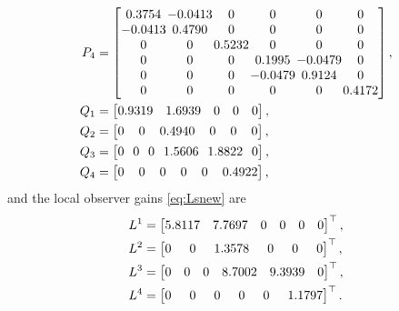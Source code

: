 \documentclass[journal]{IEEEtran}
\def\T{\top}
\def\colsep{\setlength\arraycolsep}
\begin{document}
\begin{align*}
    P_4 & =
    \colsep{0.5pt}\begin{bmatrix}
    0.3754   &-0.0413    &0       &0        &0        &0\\
   -0.0413   &0.4790     &0       &0        &0        &0\\
    0        &0          &0.5232  &0        &0        &0\\
    0        &0          &0       &0.1995   &-0.0479  &0\\
    0        &0          &0       &-0.0479  &0.9124   &0\\
    0        &0          &0       &0        &0        &0.4172
    \end{bmatrix}, \\
    Q_1 & =
    \begin{bmatrix}
            0.9319  &  1.6939 &  0 & 0 & 0
    \end{bmatrix}, \\
    Q_2 & =
    \colsep{5.75pt}\begin{bmatrix}
            0 & 0 & 0.4940 & 0 & 0 & 0
    \end{bmatrix}, \\
     Q_3 & =
    \colsep{3.5pt}\begin{bmatrix}
            0 & 0 & 0 & 1.5606  &   1.8822 & 0
    \end{bmatrix}, \\
    Q_4 & =
    \colsep{5.75pt}\begin{bmatrix}
            0 & 0 & 0 & 0 & 0 &  0.4922
    \end{bmatrix},
\end{align*}
and the local observer gains \eqref{eq:Lsnew} are
\begin{align*}
    L^{1} &= \begin{bmatrix} 5.8117 & 7.7697 & 0 & 0 & 0 & 0 \end{bmatrix}^\T, \\   
    L^{2} &= \colsep{7.2pt}\begin{bmatrix} 0 & 0 & 1.3578 & 0 & 0 & 0 \end{bmatrix}^\T, \\
    L^{3} &= \begin{bmatrix} 0 & 0 & 0 & 8.7002 & 9.3939 & 0 \end{bmatrix}^\T, \\
    L^{4} &= \colsep{7.2pt}\begin{bmatrix} 0 & 0 & 0 & 0 & 0 & 1.1797 \end{bmatrix}^\T.
\end{align*}
\end{document}
